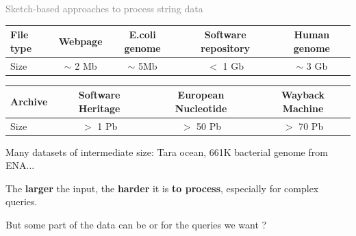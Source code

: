 \begin{frame}{\textcolor{gray}{Sketch-based approaches to process  string data}}
    \pause
    \begin{center}
        \begin{tabular}{l c c c c}
            File type & Webpage &  E.coli genome & Software repository & Human genome\\ \hline
            Size & $\sim$ 2 Mb & $\sim$ 5Mb &  $<$ 1 Gb & $\sim$ 3 Gb 
        \end{tabular}\pause

        \bigskip

        \begin{tabular}{l c c c}
            Archive & Software Heritage & European Nucleotide & Wayback Machine  \\ \hline
            Size & $>$ 1 Pb & $>$ 50 Pb &  $>$ 70 Pb
        \end{tabular}
    \end{center}\pause

    \bigskip
    Many datasets of intermediate size: Tara ocean, 661K bacterial genome from ENA...\pause

    \bigskip

    The \textbf{larger} the input, the \textbf{harder} it is \textbf{to process}, especially for complex queries.\pause

    \bigskip

    But some part of the data can be  or  for the queries we want ?\pause

\end{frame}

